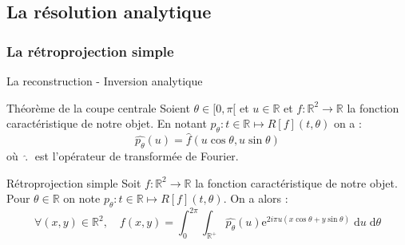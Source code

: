 \documentclass{beamer}
\newcommand*{\R}{\mathbb{R}}
\newcommand*{\dd}[1]{\mathrm{d}#1}
\begin{document}
\subsection{La résolution analytique}
\subsubsection{La rétroprojection simple}

\begin{frame}{La reconstruction - Inversion analytique}
    \begin{beamerboxesrounded}{Théorème de la coupe centrale}
        Soient $\theta \in [0,\pi[$ et $u \in \R$ et $f : \R^2 \longrightarrow \R$ la fonction caractéristique de notre objet. En notant $p_{\theta} : t \in \R \longmapsto R[f](t,\theta)$ on a : 
    $$\widehat{p_{\theta}}(u) = \widehat{f}(u \cos \theta , u \sin \theta)$$    
    où  $\; \widehat{.}\;$ est l'opérateur de transformée de Fourier.   
    \end{beamerboxesrounded}
    \begin{beamerboxesrounded}{Rétroprojection simple}
        Soit $f : \R^2 \longrightarrow \R$ la fonction caractéristique de notre objet. Pour $\theta \in \R$ on note $p_{\theta} : t \in \R \longmapsto R[f](t,\theta)$. On a alors : 
        $$\forall (x,y) \in \R^2, \quad f(x,y) = \int_{0}^{2\pi}\int_{\R^+} \widehat{p_{\theta}}(u) \mathrm{e}^{2i \pi u (x \cos \theta + y \sin \theta)} \; \dd u \; \dd \theta$$
    \end{beamerboxesrounded}

\end{frame}


\end{document}
